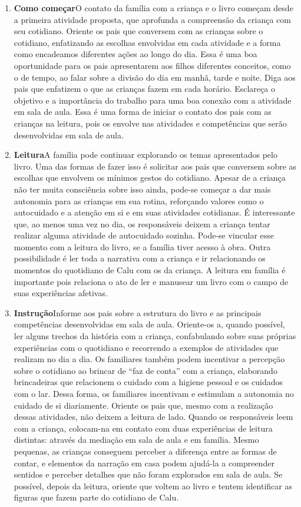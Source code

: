 \documentclass[11pt]{extarticle}
\begin{document}
\begin{enumerate}
\item \textbf{Como começar}\quad O contato da família com a criança e o livro começam desde a primeira atividade proposta, que aprofunda a compreensão da criança com seu cotidiano. 
Oriente os pais que conversem com as crianças sobre o cotidiano, enfatizando as escolhas envolvidas em cada atividade e a forma como encadeamos diferentes ações ao longo do dia. Essa é uma boa oportunidade para os pais apresentarem aos filhos diferentes conceitos, como o de tempo, ao falar sobre a divisão do dia em manhã, tarde e noite. Diga aos pais que enfatizem o que as crianças fazem em cada horário. Esclareça o objetivo e a importância do trabalho para uma boa conexão com a atividade em sala de aula. 
Essa é uma forma de iniciar o contato dos pais com as crianças na leitura, pois os envolve nas atividades e competências que serão desenvolvidas em sala de aula.


\item \textbf{Leitura}\quad A família pode continuar 
explorando os temas apresentados pelo livro. Uma das formas de fazer isso é solicitar aos pais que conversem sobre as escolhas que envolvem os mínimos gestos do cotidiano. Apesar de a criança não ter muita consciência sobre isso ainda, pode-se começar a dar mais autonomia para as crianças em sua rotina, reforçando valores como o autocuidado e a atenção em si e em suas atividades cotidianas. É interessante que, ao menos uma vez no dia, os responsáveis deixem a criança tentar realizar alguma atividade de autocuidado sozinha.
Pode-se vincular esse momento com a leitura do livro, se a família tiver acesso à obra.
Outra possibilidade é ler toda a narrativa com a criança e ir relacionando os momentos do quotidiano de Calu com os da criança. A leitura em família é importante pois relaciona o ato de ler e manusear um livro com o campo de suas experiências afetivas.


\item \textbf{Instrução}\quad Informe aos pais sobre a estrutura do livro e as principais competências desenvolvidas em sala de aula.
Oriente-os a, quando possível, ler alguns trechos da história com a criança, confabulando sobre suas próprias experiências com o quotidiano e recorrendo a exemplos de atividades que realizam no dia a dia.
Os familiares também podem incentivar a percepção sobre o cotidiano ao brincar de ``faz de conta'' com a criança, elaborando brincadeiras que relacionem o cuidado com a higiene pessoal e os cuidados com o lar. Dessa forma, os familiares incentivam e estimulam a autonomia no cuidado de si diariamente.
Oriente os pais que, mesmo com a realização dessas atividades, não deixem a leitura de lado.
Quando os responsáveis leem com a criança, colocam-na em contato com duas experiências de leitura distintas: através da mediação em sala de aula e em família. 
Mesmo pequenas, as crianças conseguem perceber a diferença entre 
as formas de contar, e elementos da narração em casa podem ajudá-la a compreender 
sentidos e perceber detalhes que não foram explorados em sala de aula. Se possível, depois da leitura, oriente que voltem ao livro e tentem identificar as figuras que fazem parte do cotidiano de Calu.


\end{enumerate}
\end{document}
